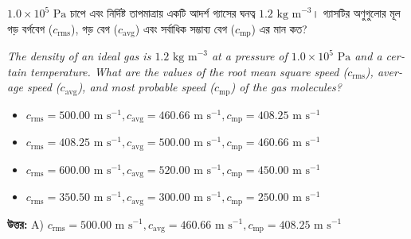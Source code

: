 \documentclass[12pt, a4paper]{article}
\begin{document}
\vspace{2em}

\begin{tcolorbox}[questionbox={প্রশ্ন (Question) 15}]
    \noindent
    $1.0 \times 10^5\text{ Pa}$ চাপে এবং নির্দিষ্ট তাপমাত্রায় একটি আদর্শ গ্যাসের ঘনত্ব $1.2\text{ kg m}^{-3}$। গ্যাসটির অণুগুলোর মূল গড় বর্গবেগ ($c_{\text{rms}}$), গড় বেগ ($c_{\text{avg}}$) এবং সর্বাধিক সম্ভাব্য বেগ ($c_{\text{mp}}$) এর মান কত?
    
    \vspace{0.8em}
    \begin{english}
    \noindent\textit{\color{darkgray}
    The density of an ideal gas is $1.2\text{ kg m}^{-3}$ at a pressure of $1.0 \times 10^5\text{ Pa}$ and a certain temperature. What are the values of the root mean square speed ($c_{\text{rms}}$), average speed ($c_{\text{avg}}$), and most probable speed ($c_{\text{mp}}$) of the gas molecules?
    }
    \end{english}
\end{tcolorbox}

\begin{itemize}[label={}, leftmargin=1cm, itemsep=0.5em]
    \item[\textbf{A)}] $c_{\text{rms}} = 500.00\text{ m s}^{-1}, c_{\text{avg}} = 460.66\text{ m s}^{-1}, c_{\text{mp}} = 408.25\text{ m s}^{-1}$
    \item[\textbf{B)}] $c_{\text{rms}} = 408.25\text{ m s}^{-1}, c_{\text{avg}} = 500.00\text{ m s}^{-1}, c_{\text{mp}} = 460.66\text{ m s}^{-1}$
    \item[\textbf{C)}] $c_{\text{rms}} = 600.00\text{ m s}^{-1}, c_{\text{avg}} = 520.00\text{ m s}^{-1}, c_{\text{mp}} = 450.00\text{ m s}^{-1}$
    \item[\textbf{D)}] $c_{\text{rms}} = 350.50\text{ m s}^{-1}, c_{\text{avg}} = 300.00\text{ m s}^{-1}, c_{\text{mp}} = 250.00\text{ m s}^{-1}$
\end{itemize}

\vspace{0.5em}
\begin{tcolorbox}[answerbox]
    \textbf{\color{success} উত্তর:} A) $c_{\text{rms}} = 500.00\text{ m s}^{-1}, c_{\text{avg}} = 460.66\text{ m s}^{-1}, c_{\text{mp}} = 408.25\text{ m s}^{-1}$
\end{tcolorbox}
\vspace{1em}
\end{document}
